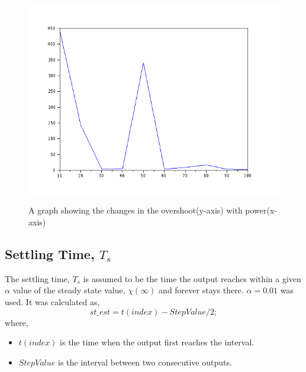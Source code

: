 \begin{figure}[H]
\centering
	\includegraphics[scale=0.5]{images/_power_vs_overshoot.png} \\
    \caption{A graph showing the changes in the overshoot(y-axis) with power(x-axis)}
\end{figure}


\subsection{Settling Time, $T _s$}
The settling time, $T _s$ is assumed to be the time the output reaches within a given $\alpha$ value of the steady state value, $\chi (\infty )$ and forever stays there.
\newline
$\alpha=0.01 $ was used. It was calculated as,
\begin{equation}
st\_est = t(index) - StepValue/2; 
\end{equation}
where,
\begin{itemize}
	\item $t(index)$ is the time when the output first reaches the interval.
    \item $StepValue$ is the interval between two consecutive outputs.
\end{itemize}

